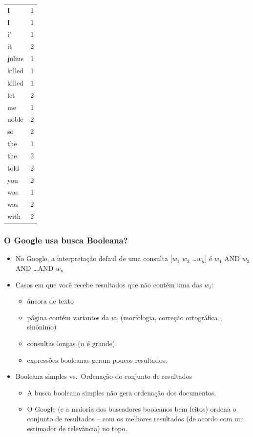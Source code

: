 \documentclass[compress]{beamer}
\begin{document}
\begin{frame}
\begin{tiny}
{\begin{tabular}{lr}
I & 1 \\
I & 1 \\
i' & 1 \\
it & 2 \\
julius & 1 \\
killed & 1 \\
killed & 1 \\
let & 2 \\
me & 1 \\
noble & 2 \\
so & 2 \\
the & 1 \\
the & 2 \\
told & 2 \\
you & 2 \\
was & 1 \\
was & 2 \\
with & 2
\end{tabular}
}
\end{tiny}
\end{frame}

\begin{frame}
\frametitle{O Google usa busca Booleana?}
\begin{itemize}
\item No Google, a interpretação defaul de uma consulta 
  [$w_1$ $w_2$ 
\ldots $w_n$] é 
  $w_1$ AND $w_2$ AND 
\ldots AND $w_n$
\item Casos em que você recebe resultados que não contém uma das $w_i$:
\begin{itemize}
\item âncora de texto
\item página contém variantes da $w_i$ (morfologia, correção ortográfica
 , sinônimo)
\item consultas longas ($n$ é grande)
\item expressões booleanas geram poucos resultados.
\end{itemize}

\item Booleana simples vs.\ Ordenação do conjunto de resultados

\begin{itemize}
\item A busca booleana simples não gera ordenação dos documentos.
\item O Google (e a maioria dos buscadores booleanos bem feitos) ordena o 
conjunto de resultados -- com os melhores resultados (de acordo com um 
estimador de relevância) no topo.

\end{itemize}
\end{itemize}
\end{frame}
\end{document}
